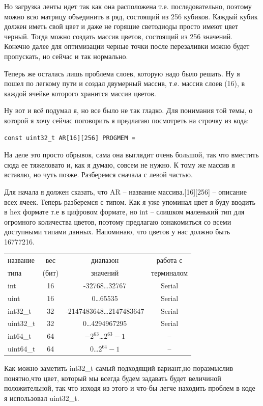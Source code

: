 \documentclass[a4paper, 12pt]{article}
\begin{document}

Но загрузка ленты идет так как она расположена т.е. последовательно, поэтому
можно всю матрицу объединить в ряд, состоящий из 256 кубиков. Каждый кубик
должен иметь свой цвет и даже не горящие светодиоды просто имеют цвет черный.
Тогда можно создать массив цветов, состоящий из 256 значений.
Конечно далее для оптимизации черные точки после перезаливки можно будет
пропускать, но сейчас и так нормально.

Теперь же осталась лишь проблема слоев, которую надо было решать. Ну я пошел
по легкому пути и создал двумерный массив, т.е. массив слоев (16), в каждой
ячейке которого хранится массив цветов.


Ну вот и всё подумал я, но все было не так гладко. Для понимания той темы, о
которой я хочу сейчас поговорить я предлагаю посмотреть на строчку из кода:
\begin{lstlisting}[style=myLatexStyle]
const uint32_t AR[16][256] PROGMEM = 
\end{lstlisting}

На деле это просто обрывок, сама она выглядит очень большой, так что вместить
сюда ее тяжеловато и, как я думаю, совсем не нужно. К тому же массив я вставлю,
но чуть позже. Разберемся сначала с левой частью.

Для начала я должен сказать, что AR -- название массива.[16][256] -- описание
всех ячеек. Теперь разберемся с типом. Как я уже упоминал цвет я буду вводить
в hex формате т.е в цифровом формате, но int -- слишком маленький тип для
огромного количества цветов, поэтому предлагаю ознакомиться со всеми доступными
типами данных. Напоминаю, что цветов у нас должно быть 16777216.

\begin{center}
  \begin{tabular}{|l|c|c|c|}
    \hline
    название  & вес   & диапазон                   & работа с   \\
    типа      & (бит) & значений                   & терминалом \\
    \hline
    int       & 16    & -32768\dots32767           & Serial     \\
    \hline
    uint      & 16    & 0\dots65535                & Serial     \\
    \hline
    int32\_t  & 32    & -2147483648\dots2147483647 & Serial     \\
    \hline
    uint32\_t & 32    & 0\dots4294967295           & Serial     \\
    \hline
    int64\_t  & 64    & $-2^{63}$\dots$2^{63}-1$   & --         \\
    \hline
    uint64\_t & 64    & 0\dots$2^{64}-1$           & --         \\
    \hline
  \end{tabular}
\end{center}
Как можно заметить int32\_t самый подходящий вариант,но поразмыслив понятно,что
цвет, который мы всегда будем задавать будет величиной положительной, так что
изходя из этого и что-бы легче находить проблем в коде я использовал uint32\_t.
\end{document}
